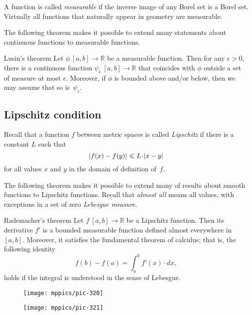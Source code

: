 \begin{multicols}{2}
{A function is called \emph{measurable} if the inverse image of any Borel set is a Borel set.
Virtually all functions that naturally appear in geometry are measurable.

The following theorem makes it possible to extend many statements about continuous functions to measurable functions.

\begin{thm}{Lusin's theorem}\label{thm:lusin}
Let $\phi\:[a,b]\to \mathbb{R}$ be a measurable function.
Then for any $\epsilon>0$, there is a continuous function $\psi_\epsilon\:[a,b]\to \mathbb{R}$ that coincides with $\phi$ outside a set of measure at most $\epsilon$.
Moreover, if $\phi$ is bounded above and/or below, then we may assume that so is~$\psi_\epsilon$.  
\end{thm}

\subsection*{Lipschitz condition}

Recall that a function $f$ between metric spaces is called \emph{Lipschitz} if there is a constant $L$ such that 
\[\dist{f(x)}{f(y)}{}\le L\cdot\dist{x}{y}{}\]
for all values $x$ and $y$ in the domain of definition of~$f$.

The following theorem makes it possible to extend many of results about smooth functions to Lipschitz functions.
Recall that {}\emph{almost all} means all values, with exceptions in a set of zero {}\emph{Lebesgue measure}.

\begin{thm}{Rademacher's theorem}\label{thm:rademacher}
Let $f\:[a,b]\to\mathbb{R}$ be a Lipschitz function.
Then its derivative $f'$ is a bounded measurable function defined almost everywhere in $[a,b]$.
Moreover, it satisfies the fundamental theorem of calculus; that is, the following identity 
\[f(b)-f(a)=\int_a^b f'(x)\cdot dx,\]
holds if the integral is understood in the sense of Lebesgue.
\end{thm}

\begin{figure*}[t!]
\begin{minipage}{.48\textwidth}
\centering
\texttt{[image: mppics/pic-320]}
\end{minipage}\hfill
\begin{minipage}{.48\textwidth}
\centering
\texttt{[image: mppics/pic-321]}
\end{minipage}
\end{figure*}

}
\end{multicols}
